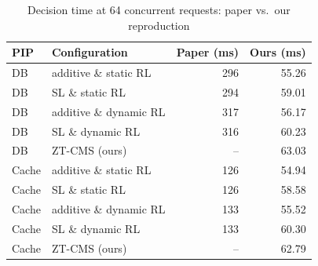 \begin{table}[t]\caption{Decision time at 64 concurrent requests: paper vs.\ our reproduction}\label{tab:repro}\centering\small\setlength{\tabcolsep}{3.5pt}
\begin{tabular}{llrr}\toprule
PIP & Configuration & Paper (ms) & Ours (ms)\\\midrule
DB & additive \& static RL & 296 & 55.26\\
DB & SL \& static RL & 294 & 59.01\\
DB & additive \& dynamic RL & 317 & 56.17\\
DB & SL \& dynamic RL & 316 & 60.23\\
DB & ZT-CMS (ours) & -- & 63.03\\
\midrule
Cache & additive \& static RL & 126 & 54.94\\
Cache & SL \& static RL & 126 & 58.58\\
Cache & additive \& dynamic RL & 133 & 55.52\\
Cache & SL \& dynamic RL & 133 & 60.30\\
Cache & ZT-CMS (ours) & -- & 62.79\\
\bottomrule\end{tabular}\end{table}
